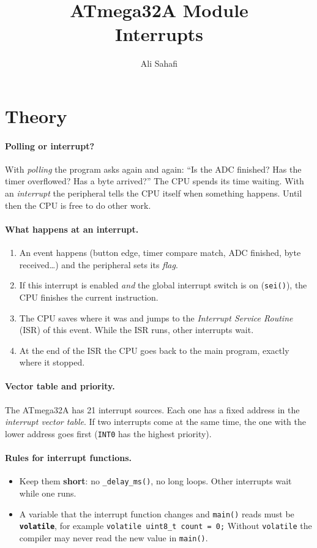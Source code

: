 \documentclass[11pt,a4paper]{article}
\title{ATmega32A Module \\ \Large Interrupts}
\author{Ali Sahafi}
\date{}
\newcommand{\code}[1]{\texttt{#1}}
\begin{document}
\maketitle
\raggedright
\setlength{\parindent}{0pt}\setlength{\parskip}{4pt}

\section{Theory}

\paragraph{Polling or interrupt?} With \emph{polling} the program asks again
and again: ``Is the ADC finished? Has the timer overflowed? Has a byte
arrived?'' The CPU spends its time waiting. With an \emph{interrupt} the
peripheral tells the CPU itself when something happens. Until then the CPU is
free to do other work.

\paragraph{What happens at an interrupt.}
\begin{enumerate}
  \item An event happens (button edge, timer compare match, ADC finished, byte received\dots)
        and the peripheral sets its \emph{flag}.
  \item If this interrupt is enabled \emph{and} the global interrupt switch is on
        (\code{sei()}), the CPU finishes the current instruction.
  \item The CPU saves where it was and jumps to the \emph{Interrupt Service Routine} (ISR)
        of this event. While the ISR runs, other interrupts wait.
  \item At the end of the ISR the CPU goes back to the main program, exactly where it stopped.
\end{enumerate}

\paragraph{Vector table and priority.} The ATmega32A has 21 interrupt sources.
Each one has a fixed address in the \emph{interrupt vector table}. If two
interrupts come at the same time, the one with the lower address goes first
(\code{INT0} has the highest priority).

\paragraph{Rules for interrupt functions.}
\begin{itemize}
  \item Keep them \textbf{short}: no \code{\_delay\_ms()}, no long loops. Other interrupts wait while one runs.
  \item A variable that the interrupt function changes and \code{main()} reads must be
        \code{\textbf{volatile}}, for example \code{volatile uint8\_t count = 0;}
        Without \code{volatile} the compiler may never read the new value in \code{main()}.
\end{itemize}
\end{document}

